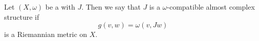 
 
 
Let $(X,  \omega)$ be a  with  $J$.
Then we say that $J$ is a $\omega$-compatible almost complex structure if 
\[ g(v,  w)=\omega(v,  Jw)\]
is a Riemannian metric on $X$.

 